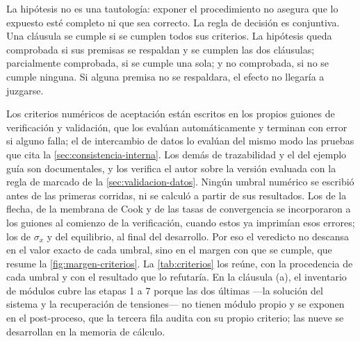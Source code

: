 La hipótesis no es una tautología: exponer el procedimiento no asegura que lo expuesto esté completo ni que sea correcto. La regla de decisión es conjuntiva. Una cláusula se cumple si se cumplen todos sus criterios. La hipótesis queda comprobada si sus premisas se respaldan y se cumplen las dos cláusulas; parcialmente comprobada, si se cumple una sola; y no comprobada, si no se cumple ninguna. Si alguna premisa no se respaldara, el efecto no llegaría a juzgarse.

Los criterios numéricos de aceptación están escritos en los propios guiones de verificación y validación, que los evalúan automáticamente y terminan con error si alguno falla; el de intercambio de datos lo evalúan del mismo modo las pruebas que cita la \autoref{sec:consistencia-interna}. Los demás de trazabilidad y el del ejemplo guía son documentales, y los verifica el autor sobre la versión evaluada con la regla de marcado de la \autoref{sec:validacion-datos}. Ningún umbral numérico se escribió antes de las primeras corridas, ni se calculó a partir de sus resultados. Los de la flecha, de la membrana de Cook y de las tasas de convergencia se incorporaron a los guiones al comienzo de la verificación, cuando estos ya imprimían esos errores; los de $\sigma_x$ y del equilibrio, al final del desarrollo. Por eso el veredicto no descansa en el valor exacto de cada umbral, sino en el margen con que se cumple, que resume la \autoref{fig:margen-criterios}. La \autoref{tab:criterios} los reúne, con la procedencia de cada umbral y con el resultado que lo refutaría. En la cláusula (a), el inventario de módulos cubre las etapas 1 a 7 porque las dos últimas ---la solución del sistema y la recuperación de tensiones--- no tienen módulo propio y se exponen en el post-proceso, que la tercera fila audita con su propio criterio; las nueve se desarrollan en la memoria de cálculo.

